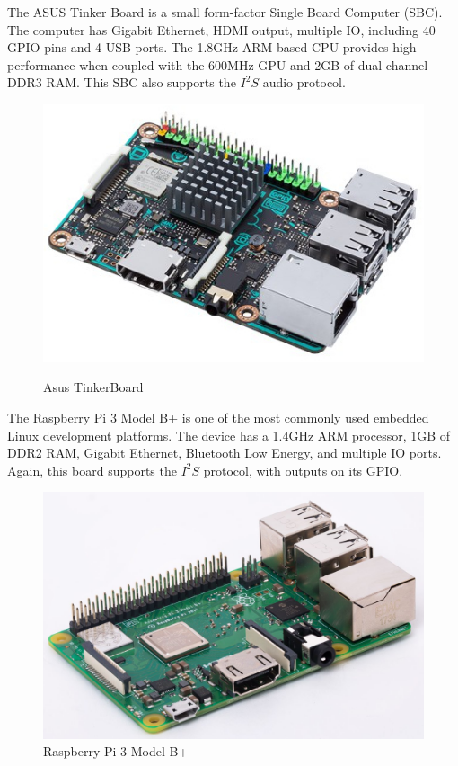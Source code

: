 \documentclass[11pt,a4paper]{scrreprt}
\begin{document}
The ASUS Tinker Board is a small form-factor Single Board Computer
(SBC). The computer has Gigabit Ethernet, HDMI output, multiple IO,
including 40 GPIO pins and 4 USB ports. The 1.8GHz ARM based CPU
provides high performance when coupled with the 600MHz GPU and 2GB of
dual-channel DDR3 RAM. This SBC also supports the \(I^2S\) audio
protocol\cite{Tinker18}.

\begin{figure}[H]
\includegraphics{BackgroundLitSurvey/AsusTB.jpeg}
\centering
\caption{Asus TinkerBoard}\cite{Tinker18}
\label{AsusTBFig}
\end{figure}

The Raspberry Pi 3 Model B+ is one of the most commonly used embedded
Linux development platforms. The device has a 1.4GHz ARM processor, 1GB
of DDR2 RAM, Gigabit Ethernet, Bluetooth Low Energy, and multiple IO
ports. Again, this board supports the \(I^2S\) protocol, with outputs on
its GPIO\cite{RPI18}.

\begin{figure}[H]
\includegraphics{BackgroundLitSurvey/Rpi.jpg}
\centering
\caption{Raspberry Pi 3 Model B+\cite{RPI18}}
\label{RPiFig}
\end{figure}
\end{document}
